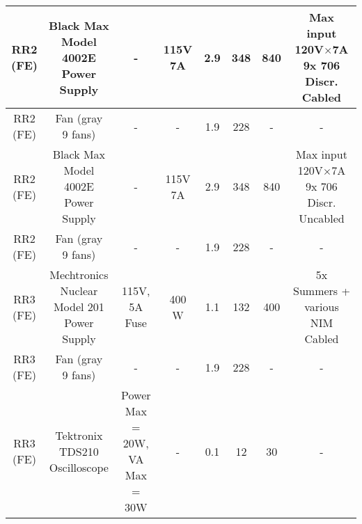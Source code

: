 \documentclass[10pt]{article}
\begin{document}
\begin{table}[h]
\begin{tabular}{|cccccccc|}
	    \hline
        \makecell{RR2\\ (FE)} & \makecell{Black Max\\ Model 4002E\\ Power Supply} & - & 115V 7A & 2.9 & 348 & 840 & \makecell{Max input\\ 120V$\times$7A\\ 9x 706 Discr.\\ Cabled}\\
        \hline
        \makecell{RR2\\ (FE)} & \makecell{Fan (gray\\ 9 fans)} & - & - & 1.9 & 228 & - & - \\
        \hline
        \makecell{RR2\\ (FE)} & \makecell{Black Max\\ Model 4002E\\ Power Supply} & - & 115V 7A & 2.9 & 348 & 840 & \makecell{Max input\\ 120V$\times$7A\\ 9x 706 Discr.\\ Uncabled}\\
        \hline
        \makecell{RR2\\ (FE)} & \makecell{Fan (gray\\ 9 fans)} & - & - & 1.9 & 228 & - & - \\
        \hline
        \makecell{RR3\\ (FE)} & \makecell{Mechtronics\\ Nuclear\\ Model 201\\ Power Supply} & \makecell{115V,\\ 5A Fuse} & 400 W & 1.1 & 132 & 400 & \makecell{5x Summers +\\ various NIM\\ Cabled}\\
        \hline
        \makecell{RR3\\ (FE)} & \makecell{Fan (gray\\ 9 fans)} & - & - & 1.9 & 228 & - & - \\
        \hline
        \makecell{RR3\\ (FE)} & \makecell{Tektronix\\ TDS210\\ Oscilloscope} & \makecell{Power Max\\ = 20W,\\ VA Max\\ = 30W} & - & 0.1 & 12 & 30 & -\\

\end{tabular}
\end{table}
\end{document}
